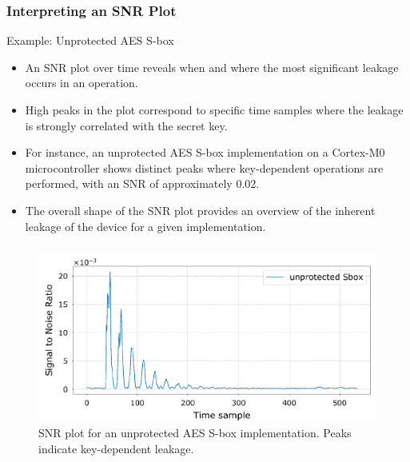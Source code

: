 \begin{frame}
    \frametitle{Interpreting an SNR Plot}
    \begin{block}{Example: Unprotected AES S-box}
        \begin{itemize}
            \item An SNR plot over time reveals when and where the most significant leakage occurs in an operation.
            \item High peaks in the plot correspond to specific time samples where the leakage is strongly correlated with the secret key.
            \item For instance, an unprotected AES S-box implementation on a Cortex-M0 microcontroller shows distinct peaks where key-dependent operations are performed, with an SNR of approximately 0.02.
            \item The overall shape of the SNR plot provides an overview of the inherent leakage of the device for a given implementation.
        \end{itemize}
    \end{block}
\end{frame}
\begin{frame}
\frametitle{}
    \begin{figure}
        \centering
        \includegraphics[width=1.0\textwidth]{metrics/Pictures/SNR_plot_unprotected_Sbox.png}
        \caption{SNR plot for an unprotected AES S-box implementation. Peaks indicate key-dependent leakage.}
    \end{figure}
\end{frame}



